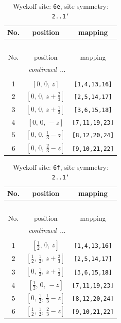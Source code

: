 \documentclass[fleqn,8pt]{jsarticle}
\begin{document}
\renewcommand{\arraystretch}{1.2}
\begin{longtable}{ccc}
\caption{Wyckoff site: {\tt 6e}, site symmetry: {\tt 2..1'}}
 \\
 \hline \hline
No. & position & mapping \\ \hline \endfirsthead

\multicolumn{2}{l}{\tablename\ \thetable{}} \\
 \hline \hline
No. & position & mapping \\ \hline \endhead

 \hline \hline
\multicolumn{2}{r}{\footnotesize\it continued ...} \\ \endfoot

 \hline \hline
\multicolumn{2}{r}{} \\ \endlastfoot

1 & $\left[ 0,\, 0,\, z \right]$ & {\tt [1,4,13,16]} \\ \hline
2 & $\left[ 0,\, 0,\, z + \frac{2}{3} \right]$ & {\tt [2,5,14,17]} \\ \hline
3 & $\left[ 0,\, 0,\, z + \frac{1}{3} \right]$ & {\tt [3,6,15,18]} \\ \hline
4 & $\left[ 0,\, 0,\, - z \right]$ & {\tt [7,11,19,23]} \\ \hline
5 & $\left[ 0,\, 0,\, \frac{1}{3} - z \right]$ & {\tt [8,12,20,24]} \\ \hline
6 & $\left[ 0,\, 0,\, \frac{2}{3} - z \right]$ & {\tt [9,10,21,22]} \\
\end{longtable}
\renewcommand{\arraystretch}{1.2}
\begin{longtable}{ccc}
\caption{Wyckoff site: {\tt 6f}, site symmetry: {\tt 2..1'}}
 \\
 \hline \hline
No. & position & mapping \\ \hline \endfirsthead

\multicolumn{2}{l}{\tablename\ \thetable{}} \\
 \hline \hline
No. & position & mapping \\ \hline \endhead

 \hline \hline
\multicolumn{2}{r}{\footnotesize\it continued ...} \\ \endfoot

 \hline \hline
\multicolumn{2}{r}{} \\ \endlastfoot

1 & $\left[ \frac{1}{2},\, 0,\, z \right]$ & {\tt [1,4,13,16]} \\ \hline
2 & $\left[ \frac{1}{2},\, \frac{1}{2},\, z + \frac{2}{3} \right]$ & {\tt [2,5,14,17]} \\ \hline
3 & $\left[ 0,\, \frac{1}{2},\, z + \frac{1}{3} \right]$ & {\tt [3,6,15,18]} \\ \hline
4 & $\left[ \frac{1}{2},\, 0,\, - z \right]$ & {\tt [7,11,19,23]} \\ \hline
5 & $\left[ 0,\, \frac{1}{2},\, \frac{1}{3} - z \right]$ & {\tt [8,12,20,24]} \\ \hline
6 & $\left[ \frac{1}{2},\, \frac{1}{2},\, \frac{2}{3} - z \right]$ & {\tt [9,10,21,22]} \\
\end{longtable}
\end{document}
